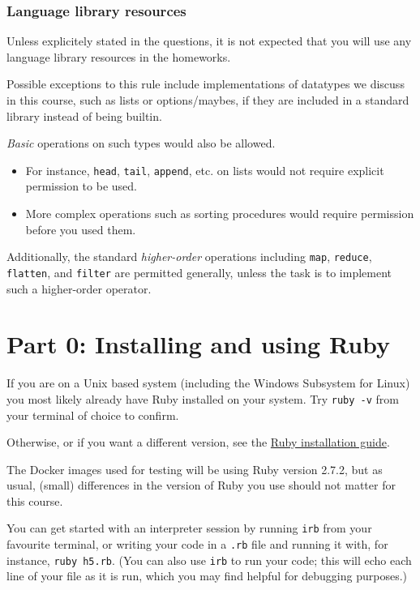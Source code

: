 \documentclass[11pt]{article}
\begin{document}
\subsubsection*{Language library resources}
\label{sec:org6237cf9}

Unless explicitely stated in the questions,
it is not expected that you will use any language library resources
in the homeworks.

Possible exceptions to this rule include implementations
of datatypes we discuss in this course, such as lists
or options/maybes, if they are included in a standard library
instead of being builtin.

\emph{Basic} operations on such types would also be allowed.
\begin{itemize}
\item For instance, \texttt{head}, \texttt{tail}, \texttt{append}, etc. on lists
would not require explicit permission to be used.
\item More complex operations such as sorting procedures
would require permission before you used them.
\end{itemize}

Additionally, the standard \emph{higher-order} operations
including \texttt{map}, \texttt{reduce}, \texttt{flatten}, and \texttt{filter} are permitted generally,
unless the task is to implement such a higher-order operator.

\section*{Part 0: Installing and using Ruby}
\label{sec:org57650d9}
If you are on a Unix based system
(including the Windows Subsystem for Linux)
you most likely already have Ruby installed on your system.
Try \texttt{ruby -v} from your terminal of choice to confirm.

Otherwise, or if you want a different version,
see the \href{https://www.ruby-lang.org/en/documentation/installation/\#rubyinstaller}{Ruby installation guide}.

The Docker images used for testing will be using Ruby version 2.7.2,
but as usual, (small) differences in the version of Ruby you use
should not matter for this course. 

You can get started with an interpreter session by running \texttt{irb} from
your favourite terminal, or writing your code in a \texttt{.rb} file
and running it with, for instance, \texttt{ruby h5.rb}.
(You can also use \texttt{irb} to run your code; this will echo
each line of your file as it is run, which you may find helpful
for debugging purposes.)
\end{document}
